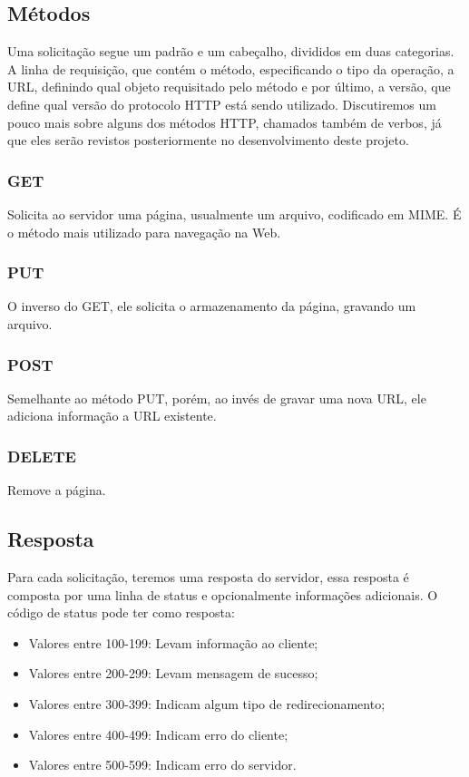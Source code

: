\subsection{Métodos}
Uma solicitação segue um padrão e um cabeçalho, divididos em duas categorias. A linha de requisição, que contém o método, especificando o tipo da operação, a URL, definindo qual objeto requisitado pelo método e por último, a versão, que define qual versão do protocolo HTTP está sendo utilizado. Discutiremos um pouco mais sobre alguns dos métodos HTTP, chamados também de verbos, já que eles serão revistos posteriormente no desenvolvimento deste projeto\cite{18370}.

\subsubsection{GET}
Solicita ao servidor uma página, usualmente um arquivo, codificado em MIME. É o método mais utilizado para navegação na Web.

\subsubsection{PUT}

O inverso do GET, ele solicita o armazenamento da página, gravando um arquivo.

\subsubsection{POST}
Semelhante ao método PUT, porém, ao invés de gravar uma nova URL, ele adiciona informação a URL existente.

\subsubsection{DELETE}
Remove a página.

\subsection{Resposta}
Para cada solicitação, teremos uma resposta do servidor, essa resposta é composta por uma linha de status e opcionalmente informações adicionais. O código de status pode ter como resposta:

\begin{itemize}
	\item Valores entre 100-199: Levam informação ao cliente;
	\item Valores entre 200-299: Levam mensagem de sucesso;	
	\item Valores entre 300-399: Indicam algum tipo de redirecionamento;
	\item Valores entre 400-499: Indicam erro do cliente;
	\item Valores entre 500-599: Indicam erro do servidor.		
\end{itemize}

